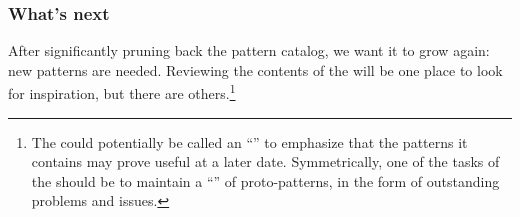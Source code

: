 \subsubsection*{What's next} After significantly pruning back the pattern catalog, we want it to grow again: new patterns are needed.  Reviewing the contents of the  will be one place to look for inspiration, but there are others.\footnote{The  could potentially be called an ``'' to emphasize that the patterns it contains may prove useful at a later date.  Symmetrically, one of the tasks of the  should be to maintain a ``'' of proto-patterns, in the form of outstanding problems and issues.}



    